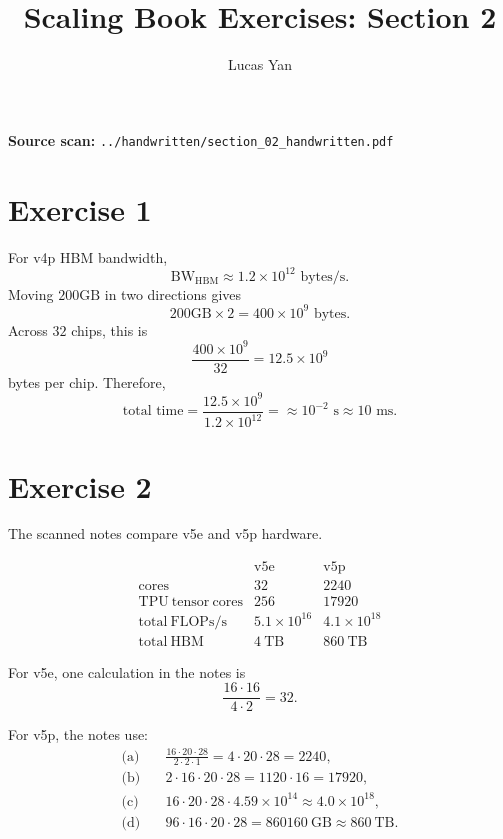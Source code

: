 \documentclass[11pt]{article}
\title{Scaling Book Exercises: Section 2}
\author{Lucas Yan}
\date{}
\begin{document}
\maketitle

\noindent
\textbf{Source scan:} \texttt{../handwritten/section\_02\_handwritten.pdf}

\section*{Exercise 1}

For v4p HBM bandwidth,
\[
\mathrm{BW}_{\mathrm{HBM}} \approx 1.2 \times 10^{12} \text{ bytes/s}.
\]
Moving $200 \mathrm{GB}$ in two directions gives
\[
200 \mathrm{GB} \times 2 = 400 \times 10^9 \text{ bytes}.
\]
Across $32$ chips, this is
\[
\frac{400 \times 10^9}{32} = 12.5 \times 10^9
\]
bytes per chip.
Therefore,
\[
\text{total time}
  =
  \frac{12.5 \times 10^9}{1.2 \times 10^{12}}
  =
  \approx 10^{-2} \text{ s}
  \approx 10 \text{ ms}.
\]

\section*{Exercise 2}

The scanned notes compare v5e and v5p hardware.

\[
\begin{array}{c|cc}
 & \mathrm{v5e} & \mathrm{v5p} \\
\hline
\mathrm{cores} & 32 & 2240 \\
\mathrm{TPU\ tensor\ cores} & 256 & 17920 \\
\mathrm{total\ FLOPs/s} & 5.1 \times 10^{16} & 4.1 \times 10^{18} \\
\mathrm{total\ HBM} & 4\ \mathrm{TB} & 860\ \mathrm{TB}
\end{array}
\]

For v5e, one calculation in the notes is
\[
\frac{16 \cdot 16}{4 \cdot 2} = 32.
\]

For v5p, the notes use:
\begin{align*}
\text{(a)}\quad & \frac{16 \cdot 20 \cdot 28}{2 \cdot 2 \cdot 1}
  = 4 \cdot 20 \cdot 28
  = 2240,\\
\text{(b)}\quad & 2 \cdot 16 \cdot 20 \cdot 28
  = 1120 \cdot 16
  = 17920,\\
\text{(c)}\quad & 16 \cdot 20 \cdot 28 \cdot 4.59 \times 10^{14}
  \approx 4.0 \times 10^{18},\\
\text{(d)}\quad & 96 \cdot 16 \cdot 20 \cdot 28
  = 860160\ \mathrm{GB}
  \approx 860\ \mathrm{TB}.
\end{align*}
\end{document}
